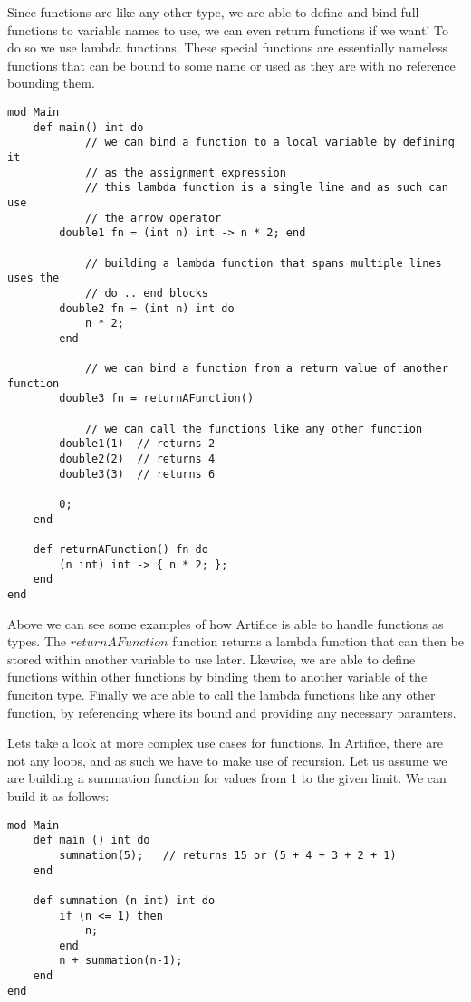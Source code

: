 \documentclass{article}
\begin{document}
Since functions are like any other type, we are able to define and bind full functions to variable names to use, we can even return functions if we want!
To do so we use lambda functions. These special functions are essentially nameless functions that can be bound to some name or used as they are
with no reference bounding them.

\begin{lstlisting}
mod Main
	def main() int do
			// we can bind a function to a local variable by defining it 
			// as the assignment expression
			// this lambda function is a single line and as such can use
			// the arrow operator
		double1 fn = (int n) int -> n * 2; end

			// building a lambda function that spans multiple lines uses the
			// do .. end blocks
		double2 fn = (int n) int do
			n * 2;
		end

			// we can bind a function from a return value of another function
		double3 fn = returnAFunction()

			// we can call the functions like any other function
		double1(1)  // returns 2
		double2(2)  // returns 4
		double3(3)  // returns 6

		0;
	end

	def returnAFunction() fn do
		(n int) int -> { n * 2; };
	end
end
\end{lstlisting}

Above we can see some examples of how Artifice is able to handle functions as types. The $returnAFunction$ function returns a lambda function
that can then be stored within another variable to use later. Lkewise, we are able to define functions within other functions by binding them
to another variable of the funciton type. Finally we are able to call the lambda functions like any other function, by referencing where its
bound and providing any necessary paramters.

Lets take a look at more complex use cases for functions. In Artifice, there are not any loops, and as such we have to make use of recursion.
Let us assume we are building a summation function for values from 1 to the given limit. We can build it as follows:

\begin{lstlisting}
mod Main
	def main () int do
		summation(5); 	// returns 15 or (5 + 4 + 3 + 2 + 1)
	end

	def summation (n int) int do
		if (n <= 1) then
			n;
		end
		n + summation(n-1);
	end
end
\end{lstlisting}
\end{document}

